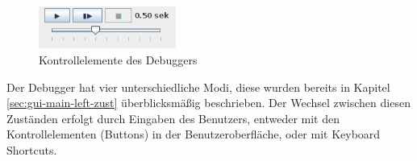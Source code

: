 \begin{figure}[h]
\centering
\includegraphics[width=0.4\textwidth]{./media/images/gui/debugger/ctrl-elements.png}
\caption{Kontrollelemente des Debuggers}
\label{fig:deb-gui-ctrl}
\end{figure}

Der Debugger hat vier unterschiedliche Modi, diese wurden bereits in Kapitel \ref{sec:gui-main-left-zust} überblicksmäßig beschrieben. Der Wechsel zwischen diesen Zuständen erfolgt durch Eingaben des Benutzers, entweder mit den Kontrollelementen (Buttons) in der Benutzeroberfläche, oder mit Keyboard Shortcuts.

